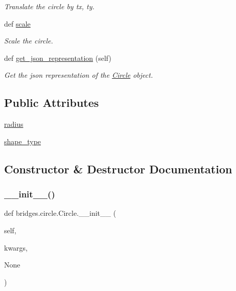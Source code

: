 \begin{DoxyCompactItemize}
\begin{DoxyCompactList}\small\item\em Translate the circle by tx, ty. \end{DoxyCompactList}\item 
def \hyperlink{classbridges_1_1circle_1_1_circle_a85f41fd8adbaca617b96b5d656d8d6ff}{scale}
\begin{DoxyCompactList}\small\item\em Scale the circle. \end{DoxyCompactList}\item 
def \hyperlink{classbridges_1_1circle_1_1_circle_a7a1be40bcd6028dab0a5bcab6e69c355}{get\+\_\+json\+\_\+representation} (self)
\begin{DoxyCompactList}\small\item\em Get the json representation of the \hyperlink{classbridges_1_1circle_1_1_circle}{Circle} object. \end{DoxyCompactList}\end{DoxyCompactItemize}
\subsection*{Public Attributes}
\begin{DoxyCompactItemize}
\item 
\hyperlink{classbridges_1_1circle_1_1_circle_ab52ae32c28ea4175b815a7b04491205b}{radius}
\item 
\hyperlink{classbridges_1_1circle_1_1_circle_a34d318970485d12445ce43225b81428e}{shape\+\_\+type}
\end{DoxyCompactItemize}


\subsection{Constructor \& Destructor Documentation}
\mbox{\label{classbridges_1_1circle_1_1_circle_a04dfb68bb632534cf715e2ce927cc76a}} 
\subsubsection{\texorpdfstring{\+\_\+\+\_\+init\+\_\+\+\_\+()}{\_\_init\_\_()}}
{\footnotesize\ttfamily def bridges.\+circle.\+Circle.\+\_\+\+\_\+init\+\_\+\+\_\+ (\begin{DoxyParamCaption}\item[{}]{self,  }\item[{}]{kwargs,  }\item[{}]{None }\end{DoxyParamCaption})}



